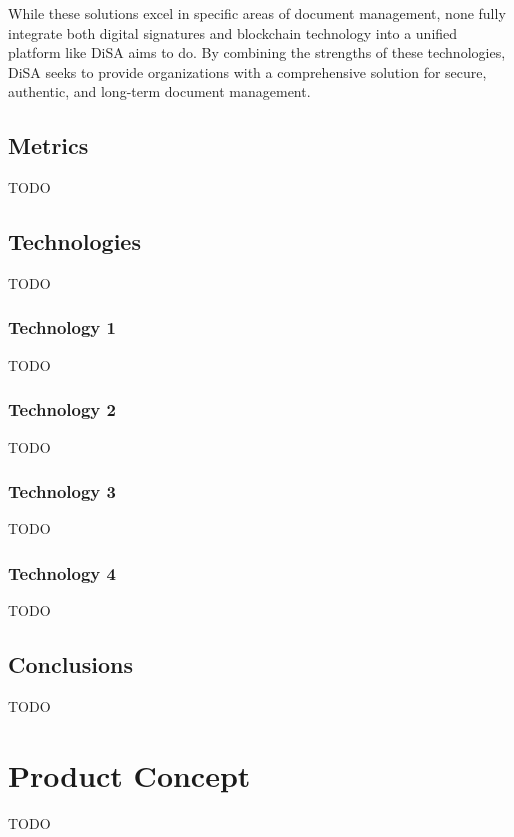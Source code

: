 \documentclass[a4paper,11pt]{article}
\begin{document}
    \vspace{0.5cm}
    While these solutions excel in specific areas of document management, none fully integrate both digital signatures and blockchain technology into a unified platform like DiSA aims to do. By combining the strengths of these technologies, DiSA seeks to provide organizations with a comprehensive solution for secure, authentic, and long-term document management.

    \vspace{0.5cm}
    \subsection{Metrics}
        TODO
        
    \vspace{0.5cm}
    \subsection{Technologies}
        TODO
        
    \subsubsection{Technology 1}
        TODO
    \subsubsection{Technology 2}
        TODO
    \subsubsection{Technology 3}
        TODO
    \subsubsection{Technology 4}
        TODO

    \vspace{0.5cm}
    \subsection{Conclusions}
        TODO

    \clearpage %
    \section{Product Concept}\label{sec:productconcept}
        TODO
        
    \vspace{0.5cm}
\end{document}
